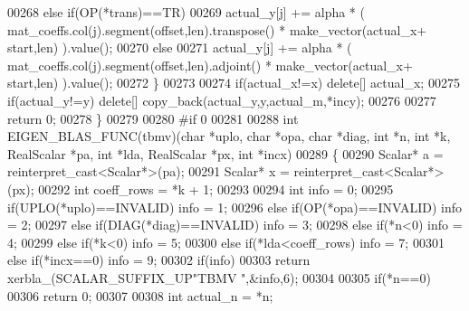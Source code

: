 \begin{DoxyCode}
00268     \textcolor{keywordflow}{else} \textcolor{keywordflow}{if}(OP(*trans)==TR)
00269       actual\_y[j] += alpha * ( mat\_coeffs.col(j).segment(offset,len).transpose() * make\_vector(actual\_x+
      start,len) ).value();
00270     \textcolor{keywordflow}{else}
00271       actual\_y[j] += alpha * ( mat\_coeffs.col(j).segment(offset,len).adjoint()   * make\_vector(actual\_x+
      start,len) ).value();
00272   \}
00273 
00274   \textcolor{keywordflow}{if}(actual\_x!=x) \textcolor{keyword}{delete}[] actual\_x;
00275   \textcolor{keywordflow}{if}(actual\_y!=y) \textcolor{keyword}{delete}[] copy\_back(actual\_y,y,actual\_m,*incy);
00276 
00277   \textcolor{keywordflow}{return} 0;
00278 \}
00279 
00280 \textcolor{preprocessor}{#if 0}
00281 
00288 \textcolor{keywordtype}{int} EIGEN\_BLAS\_FUNC(tbmv)(\textcolor{keywordtype}{char} *uplo, \textcolor{keywordtype}{char} *opa, \textcolor{keywordtype}{char} *diag, \textcolor{keywordtype}{int} *n, \textcolor{keywordtype}{int} *k, RealScalar *pa, \textcolor{keywordtype}{int} *lda, 
      RealScalar *px, \textcolor{keywordtype}{int} *incx)
00289 \{
00290   Scalar* a = \textcolor{keyword}{reinterpret\_cast<}Scalar*\textcolor{keyword}{>}(pa);
00291   Scalar* x = \textcolor{keyword}{reinterpret\_cast<}Scalar*\textcolor{keyword}{>}(px);
00292   \textcolor{keywordtype}{int} coeff\_rows = *k + 1;
00293 
00294   \textcolor{keywordtype}{int} info = 0;
00295        \textcolor{keywordflow}{if}(UPLO(*uplo)==INVALID)                                       info = 1;
00296   \textcolor{keywordflow}{else} \textcolor{keywordflow}{if}(OP(*opa)==INVALID)                                          info = 2;
00297   \textcolor{keywordflow}{else} \textcolor{keywordflow}{if}(DIAG(*diag)==INVALID)                                       info = 3;
00298   \textcolor{keywordflow}{else} \textcolor{keywordflow}{if}(*n<0)                                                       info = 4;
00299   \textcolor{keywordflow}{else} \textcolor{keywordflow}{if}(*k<0)                                                       info = 5;
00300   \textcolor{keywordflow}{else} \textcolor{keywordflow}{if}(*lda<coeff\_rows)                                            info = 7;
00301   \textcolor{keywordflow}{else} \textcolor{keywordflow}{if}(*incx==0)                                                   info = 9;
00302   \textcolor{keywordflow}{if}(info)
00303     \textcolor{keywordflow}{return} xerbla\_(SCALAR\_SUFFIX\_UP\textcolor{stringliteral}{"TBMV "},&info,6);
00304 
00305   \textcolor{keywordflow}{if}(*n==0)
00306     \textcolor{keywordflow}{return} 0;
00307 
00308   \textcolor{keywordtype}{int} actual\_n = *n;

\end{DoxyCode}
